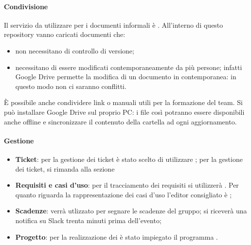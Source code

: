 	\paragraph{Condivisione}
	Il servizio da utilizzare per i documenti informali è .
	All'interno di questo repository vanno caricati documenti che:
	\begin{itemize}
		\item non necessitano di controllo di versione;
		\item necessitano di essere modificati contemporaneamente da più persone; infatti Google Drive permette la modifica di un documento in contemporanea: in questo modo non ci saranno conflitti.
	\end{itemize}
	È possibile anche condividere link o manuali utili per la formazione del team. Si può installare Google Drive sul proprio PC: i file così potranno essere disponibili anche offline e sincronizzare il contenuto della cartella ad ogni aggiornamento.
	\paragraph{Gestione}
	\begin{itemize}
		\item \textbf{Ticket}: per la gestione dei ticket è stato scelto di utilizzare ; per la gestione dei ticket, si rimanda alla sezione %
		\item \textbf{Requisiti e casi d'uso}: per il tracciamento dei requisiti si utilizzerà . Per quanto riguarda la rappresentazione dei casi d'uso l'editor consigliato è ; %
		\item \textbf{Scadenze}:  verrà utlizzato per segnare le scadenze del gruppo; si riceverà una notifica su Slack trenta minuti prima dell'evento;
		\item \textbf{Progetto}: per la realizzazione dei  è stato impiegato il programma .
	\end{itemize}